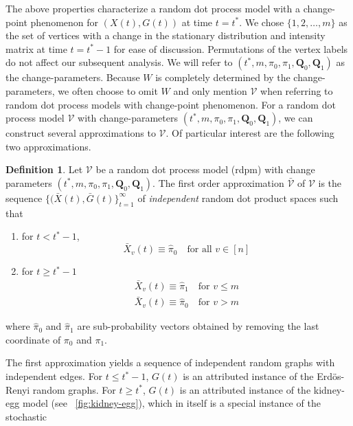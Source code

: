 \documentclass[10pt,draftclsnofoot,onecolumn]{IEEEtran}
\theoremstyle{definition}
\newtheorem{definition}{Definition}
\begin{document}
The above properties characterize a random dot process model with a
change-point phenomenon for $(X(t),G(t))$ at time $t = t^{*}$. We chose
$\{1,2,\dots,m\}$ as the set of vertices with a change in the
stationary distribution and intensity matrix at time $t = t^{*} - 1$
for ease of discussion. Permutations of the vertex labels do not
affect our subsequent analysis. We will refer to $(t^{*}, m, \pi_0,
\pi_1, \mathbf{Q}_0, \mathbf{Q}_1)$ as the change-parameters.  Because
$W$ is completely determined by the change-parameters, we often choose
to omit $W$ and only mention $\mathscr{V}$ when referring to random
dot process models with change-point phenomenon. For a random dot
process model
$\mathscr{V}$ with change-parameters $(t^{*}, m, \pi_0, \pi_1,
\mathbf{Q}_0, \mathbf{Q}_1)$, we can construct several approximations
to $\mathscr{V}$. Of particular interest are the following two
approximations.
\begin{definition}
  \label{def:1}
  Let $\mathscr{V}$ be a random dot process model (rdpm) with change
  parameters $(t^{*}, m, \pi_0, \pi_1, \mathbf{Q}_0,
  \mathbf{Q}_1)$. The first order approximation $\bar{\mathscr{V}}$ of
  $\mathscr{V}$ is the sequence $\{(\bar{X}(t), \bar{G}(t)\}_{t =
    1}^{\infty}$ of {\em independent} random dot product spaces such
  that
 \begin{enumerate}
 \item for $t < t^{*} - 1$,
   \begin{equation}
     \label{eq:5}
     \bar{X}_{v}(t)  \equiv \hat{\pi}_0 \quad \text{for all $v \in [n]$}
   \end{equation}
 \item for $t \geq t^{*} - 1$
   \begin{gather*}
     \bar{X}_{v}(t) \equiv \hat{\pi}_1 \quad \text{for $v \leq m$} \\
     \bar{X}_{v}(t) \equiv \hat{\pi}_0 \quad \text{for $v > m$} 
   \end{gather*}
 \end{enumerate}
 where $\hat{\pi}_0$ and $\hat{\pi}_1$ are sub-probability vectors
 obtained by removing the last coordinate of $\pi_0$ and $\pi_1$. 
\end{definition}
The first approximation yields a sequence of independent random graphs
with independent edges. For $t \leq t^{*} - 1$, $G(t)$ is an
attributed instance of the Erd\"{o}s-Renyi random graphs. For $t \geq
t^{*}$, $G(t)$ is an attributed instance of the kidney-egg model
\cite{rukhin11} (see \figurename~\ref{fig:kidney-egg}), which in
itself is a special instance of the stochastic
\end{document}
